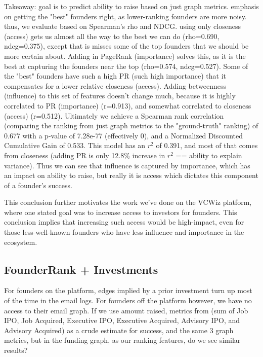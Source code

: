 Takeaway: goal is to predict ability to raise based on just graph metrics. emphasis on getting the "best" founders right, as lower-ranking founders are more noisy. thus, we evaluate based on Spearman's rho and NDCG. using only closeness (access) gets us almost all the way to the best we can do (rho=0.690, ndcg=0.375), except that is misses some of the top founders that we should be more certain about. Adding in PageRank (importance) solves this, as it is the best at capturing the founders near the top (rho=0.574, ndcg=0.527). Some of the "best" founders have such a high PR (such high importance) that it compensates for a lower relative closeness (access). Adding betweenness (influence) to this set of features doesn't change much, because it is highly correlated to PR (importance) (r=0.913), and somewhat correlated to closeness (access) (r=0.512). Ultimately we achieve a Spearman rank correlation (comparing the ranking from just graph metrics to the "ground-truth" ranking) of 0.677 with a p-value of 7.28e-77 (effectively 0), and a Normalized Discounted Cumulative Gain of 0.533. This model has an $r^2$ of 0.391, and most of that comes from closeness (adding PR is only 12.8\% increase in $r^2$ == ability to explain variance). Thus we can see that influence is captured by importance, which has an impact on ability to raise, but really it is access which dictates this component of a founder's success.

This conclusion further motivates the work we've done on the VCWiz platform, where one stated goal was to increase access to investors for founders. This conclusion implies that increasing such access would be high-impact, even for those less-well-known founders who have less influence and importance in the ecosystem.

\subsection{FounderRank + Investments}

For founders on the platform, edges implied by a prior investment turn up most of the time in the email logs. For founders off the platform however, we have no access to their email graph. If we use amount raised, metrics from \cite{2017arXiv170604229H} (sum of Job IPO, Job Acquired, Executive IPO, Executive Acquired, Advisory IPO, and Advisory Acquired) as a crude estimate for success, and the same 3 graph metrics, but in the funding graph, as our ranking features, do we see similar results?

